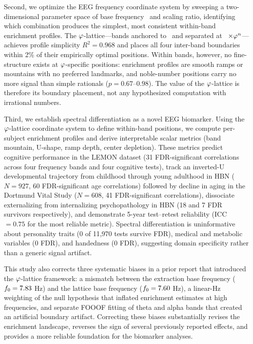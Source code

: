 Second, we optimize the EEG frequency coordinate system by sweeping a two-dimensional parameter space of base frequency \fzero\ and scaling ratio, identifying which combination produces the simplest, most consistent within-band enrichment profiles. The $\varphi$-lattice---bands anchored to \fzero\ and separated at \fzero\ $\times \varphi^n$---achieves profile simplicity $R^2 = 0.968$ and places all four inter-band boundaries within 2\% of their empirically optimal positions. Within bands, however, no fine-structure exists at $\varphi$-specific positions: enrichment profiles are smooth ramps or mountains with no preferred landmarks, and noble-number positions carry no more signal than simple rationals ($p = 0.67$--$0.98$). The value of the $\varphi$-lattice is therefore its boundary placement, not any hypothesized computation with irrational numbers.

Third, we establish spectral differentiation as a novel EEG biomarker. Using the $\varphi$-lattice coordinate system to define within-band positions, we compute per-subject enrichment profiles and derive interpretable scalar metrics (band mountain, U-shape, ramp depth, center depletion). These metrics predict cognitive performance in the LEMON dataset (31 FDR-significant correlations across four frequency bands and four cognitive tests), track an inverted-U developmental trajectory from childhood through young adulthood in HBN ($N = 927$, 60 FDR-significant age correlations) followed by decline in aging in the Dortmund Vital Study ($N = 608$, 41 FDR-significant correlations), dissociate externalizing from internalizing psychopathology in HBN (18 and 7 FDR survivors respectively), and demonstrate 5-year test--retest reliability (ICC $= 0.75$ for the most reliable metric). Spectral differentiation is uninformative about personality traits (0 of 11,970 tests survive FDR), medical and metabolic variables (0 FDR), and handedness (0 FDR), suggesting domain specificity rather than a generic signal artifact.

This study also corrects three systematic biases in a prior report \parencite{lacy2026frontiers} that introduced the $\varphi$-lattice framework: a mismatch between the extraction base frequency ($f_0 = 7.83$ Hz) and the lattice base frequency ($f_0 = 7.60$ Hz), a linear-Hz weighting of the null hypothesis that inflated enrichment estimates at high frequencies, and separate FOOOF fitting of theta and alpha bands that created an artificial boundary artifact. Correcting these biases substantially revises the enrichment landscape, reverses the sign of several previously reported effects, and provides a more reliable foundation for the biomarker analyses.

